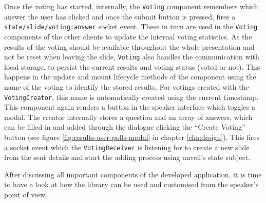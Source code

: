 Once the voting has started, internally, the \texttt{Voting} component remembers which answer the user has clicked and once the submit button is pressed, fires a \texttt{state/slide/voting:answer} socket event. These in turn are used in the \texttt{Voting} components of the other clients to update the internal voting statistics. As the results of the voting should be available throughout the whole presentation and not be reset when leaving the slide, \texttt{Voting} also handles the communication with local storage, to persist the current results and voting status (voted or not). This happens in the update and mount lifecycle methods of the component using the name of the voting to identify the stored results. For votings created with the \texttt{VotingCreator}, this name is automatically created using the current timestamp. This component again renders a button in the speaker interface which toggles a modal. The creator internally stores a question and an array of answers, which can be filled in and added through the dialogue clicking the ``Create Voting'' button (see figure \ref{fig:results-user-polls-modal} in chapter \ref{cha:design}). This fires a socket event which the \texttt{VotingReceiver} is listening for to create a new slide from the sent details and start the adding process using unveil's state subject.

After discussing all important components of the developed application, it is time to have a look at how the library can be used and customised from the speaker's point of view.
